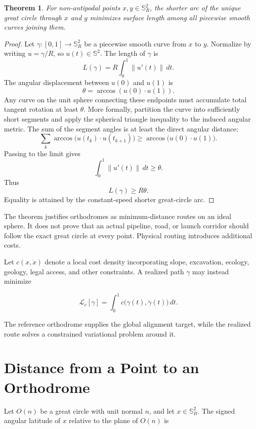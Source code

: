 \documentclass[11pt,fleqn]{book}
\numberwithin{equation}{chapter}
\theoremstyle{plain}
\newtheorem{theorem}{Theorem}[chapter]
\theoremstyle{definition}
\theoremstyle{remark}
\newcommand{\Sphere}{\mathbb{S}^{2}}
\begin{document}
\begin{theorem}
For non-antipodal points \(x,y\in\Sphere_R\), the shorter arc of the unique great circle through \(x\) and \(y\) minimizes surface length among all piecewise smooth curves joining them.
\end{theorem}

\begin{proof}
Let \(\gamma:[0,1]\to\Sphere_R\) be a piecewise smooth curve from \(x\) to \(y\). Normalize by writing \(u=\gamma/R\), so \(u(t)\in\Sphere\). The length of \(\gamma\) is
\[
L(\gamma)
=
R\int_0^1\|u'(t)\|\,dt.
\]
The angular displacement between \(u(0)\) and \(u(1)\) is
\[
\theta
=
\arccos(u(0)\cdot u(1)).
\]
Any curve on the unit sphere connecting these endpoints must accumulate total tangent rotation at least \(\theta\). More formally, partition the curve into sufficiently short segments and apply the spherical triangle inequality to the induced angular metric. The sum of the segment angles is at least the direct angular distance:
\[
\sum_{k}
\arccos\bigl(u(t_k)\cdot u(t_{k+1})\bigr)
\geq
\arccos\bigl(u(0)\cdot u(1)\bigr).
\]
Passing to the limit gives
\[
\int_0^1\|u'(t)\|\,dt\geq\theta.
\]
Thus
\[
L(\gamma)\geq R\theta.
\]
Equality is attained by the constant-speed shorter great-circle arc.
\end{proof}

The theorem justifies orthodromes as minimum-distance routes on an ideal sphere. It does not prove that an actual pipeline, road, or launch corridor should follow the exact great circle at every point. Physical routing introduces additional costs.

Let \(c(x,\dot x)\) denote a local cost density incorporating slope, excavation, ecology, geology, legal access, and other constraints. A realized path \(\gamma\) may instead minimize

\begin{equation}
    \mathcal{L}_c[\gamma]
    =
    \int_0^1
    c\bigl(\gamma(t),\dot\gamma(t)\bigr)
    \,dt.
\end{equation}

The reference orthodrome supplies the global alignment target, while the realized route solves a constrained variational problem around it.

\section{Distance from a Point to an Orthodrome}

Let \(O(n)\) be a great circle with unit normal \(n\), and let \(x\in\Sphere_R\). The signed angular latitude of \(x\) relative to the plane of \(O(n)\) is
\end{document}
